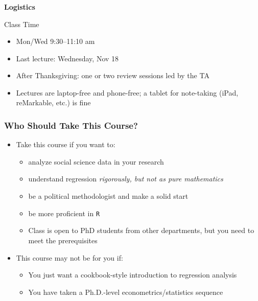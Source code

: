\documentclass[xcolor=svgnames,9pt,english,aspectratio=169,t]{beamer}
\newif\ifrelease
\begin{document}
\begin{frame}\frametitle{}
{\Large\textbf{Logistics}}
\end{frame}

\begin{frame}{Class Time}
  \begin{itemize}
    \itemsep20pt\parskip0pt
\ifrelease
  \item Two 100-minute lectures a week, plus a weekly section led by the TA
\else
  \item Mon/Wed 9:30--11:10 am

  \item Last lecture: Wednesday, Nov 18

  \item After Thanksgiving: one or two review sessions led by the TA
\fi

  \item Lectures are laptop-free and phone-free; a tablet for note-taking (iPad, reMarkable, etc.) is fine
  \end{itemize}
\end{frame}


\begin{frame}
  \frametitle{Who Should Take This Course?}
\begin{itemize}
\item Take this course if you want to:
	\begin{itemize}
	\item analyze social science data in your research
  \item understand regression \emph{rigorously, but not as pure mathematics}
	\item be a political methodologist and make a solid start
  \item be more proficient in \texttt{R}\pause 
  \item[*] Class is open to PhD students from other departments, but you need to meet the prerequisites 
	\end{itemize}
\pause \bigskip
\item This course may not be for you if:
	\begin{itemize}
	\item You just want a cookbook-style introduction to regression analysis
	\item You have taken a Ph.D.-level econometrics/statistics sequence
	\end{itemize}
\end{itemize}
\end{frame}
\end{document}
